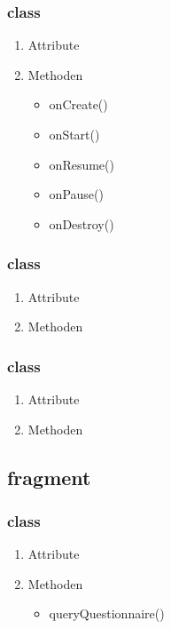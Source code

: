 \documentclass[a4paper]{scrreprt}
\begin{document}
                \subsubsection{class }
                \begin{enumerate}
                        \item Attribute
                        \item Methoden
                            \begin{itemize}
                                \item onCreate()
                                \item onStart()
                                \item onResume()
                                \item onPause()
                                \item onDestroy()
                            \end{itemize}
                \end{enumerate}
                \subsubsection{class }
                \begin{enumerate}
                        \item Attribute
                        \item Methoden
                \end{enumerate}
                \subsubsection{class }
                 \begin{enumerate}
                        \item Attribute
                        \item Methoden
                \end{enumerate}

            \subsection{fragment}

                \subsubsection{class }
                \begin{enumerate}
                \item Attribute
                \item Methoden
                     \begin{itemize}
                                \item queryQuestionnaire()
                     \end{itemize}
                \end{enumerate}
\end{document}
